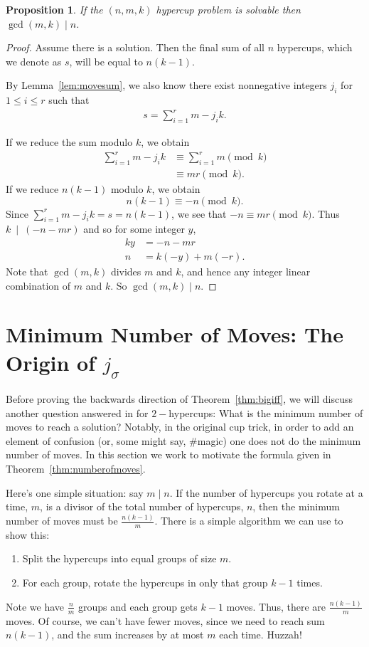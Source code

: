 \documentclass{article}
\theoremstyle{theorem}
\newtheorem{proposition}[theorem]{Proposition}
\theoremstyle{definition}
\begin{document}
\begin{proposition}
   If the $(n,m,k)$ hypercup problem is solvable then $\gcd(m,k)\mid n$. 
\end{proposition}
\begin{proof}
  Assume there is a solution. Then the final sum of all $n$ hypercups, which we denote as $s$, will be equal to $n(k-1)$.

  By Lemma~\ref{lem:movesum}, we also know there exist nonnegative integers $j_i$ for $1\le i\le r$ such that 
  \begin{align*}
      s=\sum_{i=1}^r m-j_ik.
  \end{align*}
 
  If we reduce the sum modulo $k$, we obtain
  \begin{align*}
      \sum_{i=1}^r m-j_ik &\equiv \sum_{i=1}^r m\pmod{k}\\ 
      &\equiv mr\pmod k.
  \end{align*}
If we reduce $n(k-1)$ modulo $k$, we obtain
$$n(k-1)\equiv -n\pmod k.$$
Since $\sum_{i=1}^r m-j_ik=s = n(k-1)$, we see that $-n\equiv mr \pmod k$. Thus $k~\mid~(-n -mr)$ and so for some integer $y$, 
    \begin{align*}
        ky &= -n-mr\\
        n&=k(-y)+m(-r).
    \end{align*}
  Note that $\gcd(m,k)$ divides $m$ and $k$, and hence any integer linear combination of $m$ and $k$. So $\gcd (m,k) \mid n$.
\end{proof}


\section*{Minimum Number of Moves: The Origin of $j_\sigma$}

Before proving the backwards direction of Theorem~\ref{thm:bigiff}, we will discuss another question answered in \cite{SS10} for $2-$hypercups: What is the minimum number of moves to reach a solution? Notably, in the original cup trick, in order to add an element of confusion (or, some might say, \#magic)  one does not do the minimum number of moves. In this section we work to motivate the formula given in Theorem~\ref{thm:numberofmoves}. 

Here's one simple situation: say $m\mid n$. If the number of hypercups you rotate at a time, $m$, is a divisor of the total number of hypercups, $n$, then the minimum number of moves must be $\frac{n(k-1)}{m}$. There is a simple algorithm we can use to show this:
    \begin{enumerate}
        \item Split the hypercups into equal groups of size $m$.
        \item For each group, rotate the hypercups in only that group $k-1$ times.
    \end{enumerate}
Note we have $\frac{n}{m}$ groups and each group gets $k-1$ moves. Thus, there are $\frac{n(k-1)}{m}$ moves.  Of course, we can't have fewer moves, since we need to reach sum $n(k-1)$, and the sum increases by at most $m$ each time. Huzzah! 
\end{document}
